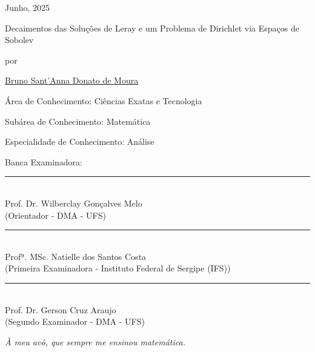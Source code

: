 \vspace{1cm}
\begin{center}
		Junho, 2025
\end{center}

\pagebreak

\thispagestyle{empty}

\begin{center}
\Large{Decaimentos das Soluções de Leray e um Problema de Dirichlet via Espaços de Sobolev}


\vspace{0.5cm}

{por}

\vspace{1.0cm}

\href{http://lattes.cnpq.br/4171937682648273}
{\large{Bruno Sant'Anna Donato de Moura}}
\end{center}

\vspace{1.0cm}

\noindent Área de Conhecimento: Ciências Exatas e Tecnologia

\noindent Subárea de Conhecimento: Matemática

\noindent Especialidade de Conhecimento: Análise

\vspace{1.0cm}

\noindent Banca Examinadora:

\vspace{2.5cm}


\begin{center}
\rule{10cm}{.1mm} \\
{Prof. Dr. Wilberclay Gonçalves Melo } \\
(Orientador - DMA - UFS)
\vspace{0.8cm}


\rule{10cm}{.1mm} \\
{Profª. MSc. Natielle dos Santos Costa} \\
(Primeira Examinadora - Instituto Federal de Sergipe (IFS))
\vspace{0.8cm}


\rule{10cm}{.1mm} \\
{Prof. Dr. Gerson Cruz Araujo} \\
(Segundo Examinador - DMA - UFS)
\vspace{0.8cm}

\end{center}

\pagebreak

\thispagestyle{empty}

\mbox{}

\vspace{19cm}


\hfill{
\begin{minipage}[b]{6.5cm}
\slshape{\large{À meu avô, que sempre me ensinou matemática.
		} }

\end{minipage}}

\pagebreak

